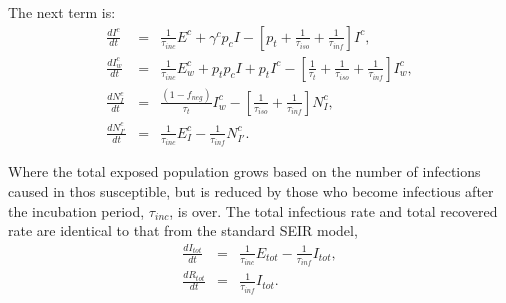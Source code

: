 \documentclass[notitlepage, superscriptaddress]{revtex4-2}
\begin{document}

The next term is:
\begin{eqnarray}
\label{E:dIc}
 \frac{dI^{c}}{dt} &=& \frac{1}{\tau_{inc}} E^{c} + \gamma^{c} p_{c} I -[p_{t} +\frac{1}{\tau_{iso}} + \frac{1}{\tau_{inf}}] I^{c}, \\
 \frac{dI^{c}_{w}}{dt} &=& \frac{1}{\tau_{inc}} E^{c}_{w} + p_{t}p_{c} I + p_{t}I^{c} - [\frac{1}{\tau_{t}}  + \frac{1}{\tau_{iso}}  + \frac{1}{\tau_{inf}}] I^{c}_{w}, \\ 
 \frac{dN^{c}_{I}}{dt} &=&  \frac{(1-f_{neg})}{\tau_{t}} I^{c}_{w} - [\frac{1}{\tau_{iso}}  + \frac{1}{\tau_{inf}}] N^{c}_{I}, \\
 \frac{dN^{c}_{I'}}{dt} &=&  \frac{1}{\tau_{inc}} E^{c}_{I} - \frac{1}{\tau_{inf}}N^{c}_{I'}.
\end{eqnarray}


Where the total exposed population grows based on the number of infections caused in thos susceptible, but is reduced by those who become infectious after the incubation period, $\tau_{inc}$, is over. The total infectious rate and total recovered rate are identical to that from the standard SEIR model,
\begin{eqnarray}
\label{E:dItot}
\frac{dI_{tot}}{dt} &=& \frac{1}{\tau_{inc}}E_{tot} - \frac{1}{\tau_{inf}}I_{tot}, \\
\frac{dR_{tot}}{dt} &=& \frac{1}{\tau_{inf}}I_{tot}.
\end{eqnarray}


\end{document}
